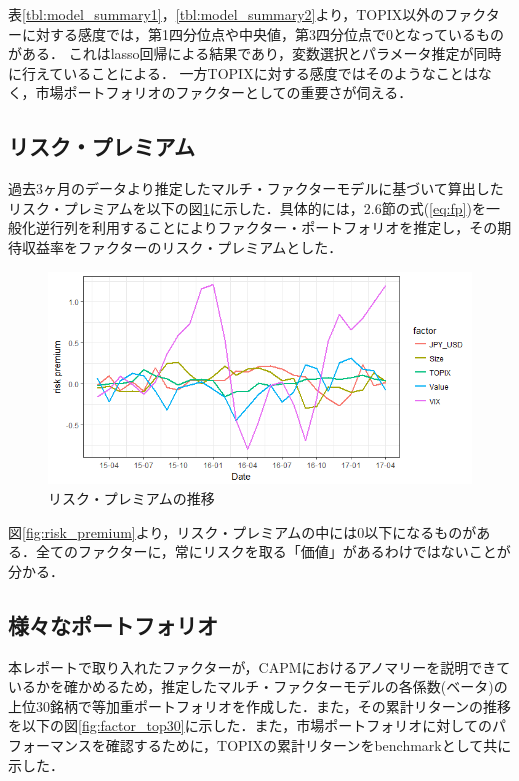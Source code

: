 ﻿\documentclass[a4paper]{jarticle}
\begin{document}
表\ref{tbl:model_summary1}，\ref{tbl:model_summary2}より，TOPIX以外のファクターに対する感度では，第1四分位点や中央値，第3四分位点で0となっているものがある．
これはlasso回帰による結果であり，変数選択とパラメータ推定が同時に行えていることによる．
一方TOPIXに対する感度ではそのようなことはなく，市場ポートフォリオのファクターとしての重要さが伺える．

\subsection{リスク・プレミアム}
過去3ヶ月のデータより推定したマルチ・ファクターモデルに基づいて算出したリスク・プレミアムを以下の図\ref{fig:riskpremium}に示した．具体的には，2.6節の式(\ref{eq:fp})を一般化逆行列を利用することによりファクター・ポートフォリオを推定し，その期待収益率をファクターのリスク・プレミアムとした．

\begin{figure}[H]
	\begin{center}
		\includegraphics[width=15cm]{./fig/riskpremium.png}
		\caption{リスク・プレミアムの推移}
		\label{fig:riskpremium}
	\end{center}
\end{figure}

図\ref{fig:risk_premium}より，リスク・プレミアムの中には0以下になるものがある．全てのファクターに，常にリスクを取る「価値」があるわけではないことが分かる．

\subsection{様々なポートフォリオ}

本レポートで取り入れたファクターが，CAPMにおけるアノマリーを説明できているかを確かめるため，推定したマルチ・ファクターモデルの各係数(ベータ)の上位30銘柄で等加重ポートフォリオを作成した．また，その累計リターンの推移を以下の図\ref{fig:factor_top30}に示した．また，市場ポートフォリオに対してのパフォーマンスを確認するために，TOPIXの累計リターンをbenchmarkとして共に示した．
\end{document}
